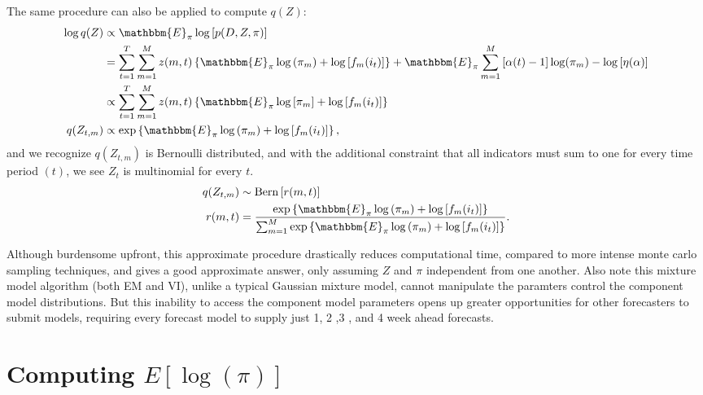 \documentclass[12pt]{article}
\def\l{\left}
\def\r{\right}
\begin{document}
The same procedure can also be applied to compute $q(Z)$:
\begin{align}
  \log q(Z) &\propto \mathbbm{E}_{\pi} \log \l[ p(D,Z,\pi)\r] \nonumber \\
            &=  \sum_{t=1}^{T} \sum_{m=1}^{M}  z(m,t) \l\{\mathbbm{E}_{\pi} \log \l( \pi_m \r) + \log \l[ f_{m}(i_{t}) \r]\r\} +  \mathbbm{E}_{\pi}\sum_{m=1}^{M} \l[\alpha(t)-1\r] \log(\pi_{m}) - \log\l[\eta(\alpha)\r] \nonumber \\
            & \propto \sum_{t=1}^{T} \sum_{m=1}^{M}  z(m,t) \l\{ \mathbbm{E}_{\pi} \log \l[ \pi_m \r] + \log \l[ f_{m}(i_{t}) \r] \r\} \nonumber \\
  q(Z_{t,m}) &\propto  \exp \l \{ \mathbbm{E}_{\pi} \log \l( \pi_m \r) + \log \l[ f_{m}(i_{t}) \r] \r \}  \label{notNorm},
\end{align}
and we recognize $q(Z_{t,m})$ is Bernoulli distributed, and with the additional constraint that all indicators must sum to one for every time period $(t)$, we see $Z_{t}$ is multinomial for every $t$. 
\begin{align}
  q(Z_{t,m}) &\sim \mathrm{Bern}\l[ r(m,t) \r]\\
  r(m,t) &= \dfrac{ \exp \l \{ \mathbbm{E}_{\pi} \log \l( \pi_m \r) + \log \l[ f_{m}(i_{t}) \r] \r \} } {\sum_{m=1}^{M} \exp \l \{ \mathbbm{E}_{\pi} \log \l( \pi_m \r) + \log \l[ f_{m}(i_{t}) \r] \r \}}.
\end{align}

Although burdensome upfront, this approximate procedure drastically reduces computational time, compared to more intense monte carlo sampling techniques, and gives a good approximate answer, only assuming $Z$ and $\pi$ independent from one another.
Also note this mixture model algorithm (both EM and VI), unlike a typical Gaussian mixture model, cannot manipulate the paramters control the component model distributions.
But this inability to access the component model parameters opens up greater opportunities for other forecasters to submit models, requiring every forecast model to supply just 1, 2 ,3 , and 4 week ahead forecasts.

\section{Computing $E\l[\log(\pi)\r]$}
\label{app.expec}
\end{document}
